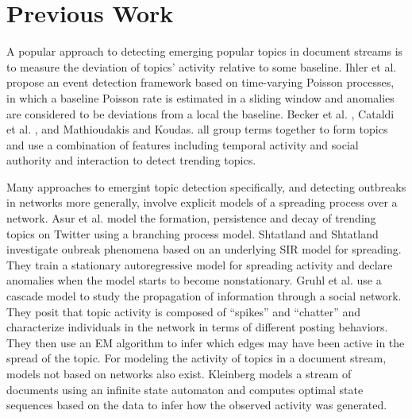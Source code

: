 
\section{Previous Work}


A popular approach to detecting emerging popular topics in document streams is
to measure the deviation of topics' activity relative to some baseline. Ihler et
al. \cite{people} propose an event detection framework based on time-varying Poisson
processes, in which a baseline Poisson rate is estimated in a sliding window and
anomalies are considered to be deviations from a local the baseline. Becker et
al. \cite{people}, Cataldi et al. \cite{people}, and Mathioudakis and Koudas. \cite{people} all
group terms together to form topics and use a combination of features including
temporal activity and social authority and interaction to detect trending
topics.

Many approaches to emergint topic detection specifically, and detecting
outbreaks in networks more generally, involve explicit models of a spreading
process over a network.  Asur et al. \cite{people} model the formation, persistence
and decay of trending topics on Twitter using a branching process
model. Shtatland and Shtatland \cite{people} investigate oubreak phenomena based on an
underlying SIR model for spreading. They train a stationary autoregressive model
for spreading activity and declare anomalies when the model starts to become
nonstationary. Gruhl et al. \cite{people} use a cascade model to study the propagation
of information through a social network. They posit that topic activity is
composed of ``spikes'' and ``chatter'' and characterize individuals in the
network in terms of different posting behaviors. They then use an EM algorithm
to infer which edges may have been active in the spread of the topic. For
modeling the activity of topics in a document stream, models not based on
networks also exist. Kleinberg \cite{people} models a stream of documents using an
infinite state automaton and computes optimal state sequences based on the data
to infer how the observed activity was generated.

